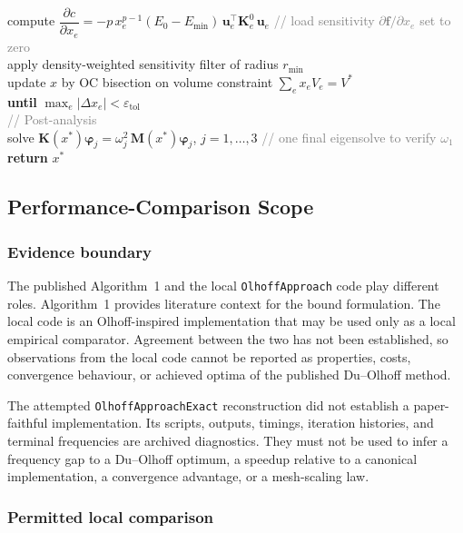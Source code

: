\documentclass[12pt,a4paper]{article}
\newcommand{\kw}[1]{\textbf{#1}}          %
\newcommand{\var}[1]{\textit{#1}}         %
\newcommand{\cm}[1]{\textcolor{gray}{#1}} %
\newcommand{\ind}{\hspace*{1.4em}}        %
\begin{document}
\begin{algobox}
\ind compute
  $\dfrac{\partial c}{\partial x_e}
  = -p\,x_e^{p-1}(E_0-E_{\min})\,\mathbf{u}_e^{\top}\mathbf{K}_e^0\,\mathbf{u}_e$
  \quad\cm{// load sensitivity $\partial\mathbf{f}/\partial x_e$ set to zero}\\
\ind apply density-weighted sensitivity filter of radius $r_{\min}$\\
\ind update $x$ by OC bisection on volume constraint
  $\sum_e x_e V_e = V^*$\\
\kw{until} $\max_e|\Delta x_e| < \varepsilon_{\mathrm{tol}}$\\[4pt]
%
\cm{// Post-analysis}\\
solve $\mathbf{K}(\var{x}^*)\boldsymbol{\varphi}_j
      = \omega_j^2\,\mathbf{M}(\var{x}^*)\boldsymbol{\varphi}_j$,
  \;$j=1,\ldots,3$
  \quad\cm{// one final eigensolve to verify $\omega_1$}\\[4pt]
\kw{return} $x^*$
\end{algobox}

\subsection{Performance-Comparison Scope}
\label{subsec:complexity}

\subsubsection*{Evidence boundary}

The published Algorithm~1 and the local \texttt{OlhoffApproach} code play
different roles.  Algorithm~1 provides literature context for the bound
formulation.  The local code is an Olhoff-inspired implementation that may
be used only as a local empirical comparator.  Agreement between the two
has not been established, so observations from the local code cannot be
reported as properties, costs, convergence behaviour, or achieved optima of
the published Du--Olhoff method.

The attempted \texttt{OlhoffApproachExact} reconstruction did not establish
a paper-faithful implementation.  Its scripts, outputs, timings, iteration
histories, and terminal frequencies are archived diagnostics.  They must not
be used to infer a frequency gap to a Du--Olhoff optimum, a speedup relative
to a canonical implementation, a convergence advantage, or a mesh-scaling
law.

\subsubsection*{Permitted local comparison}
\end{document}
